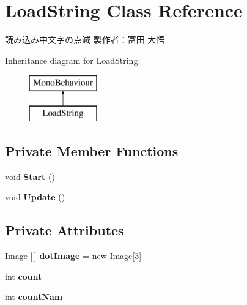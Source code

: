 \hypertarget{class_load_string}{}\section{Load\+String Class Reference}
\label{class_load_string}


読み込み中文字の点滅 製作者：冨田 大悟  


Inheritance diagram for Load\+String\+:\begin{figure}[H]
\begin{center}
\leavevmode
\includegraphics[height=2.000000cm]{class_load_string}
\end{center}
\end{figure}
\subsection*{Private Member Functions}
\begin{DoxyCompactItemize}
\item 
\mbox{\label{class_load_string_a78781c5ec58d3f61160d1a9bfd0e0642}} 
void {\bfseries Start} ()
\item 
\mbox{\label{class_load_string_a071a465f37c98b122b0cc6bd98fe5362}} 
void {\bfseries Update} ()
\end{DoxyCompactItemize}
\subsection*{Private Attributes}
\begin{DoxyCompactItemize}
\item 
\mbox{\label{class_load_string_a975b536a97a585caabb337978195a363}} 
Image \mbox{[}$\,$\mbox{]} {\bfseries dot\+Image} = new Image\mbox{[}3\mbox{]}
\item 
\mbox{\label{class_load_string_a6dd0fb170efcae3f17f0d2cb568b0811}} 
int {\bfseries count}
\item 
\mbox{\label{class_load_string_af38b8b3305bb225c7bd10de9d455b2b1}} 
int {\bfseries count\+Nam}
\end{DoxyCompactItemize}



